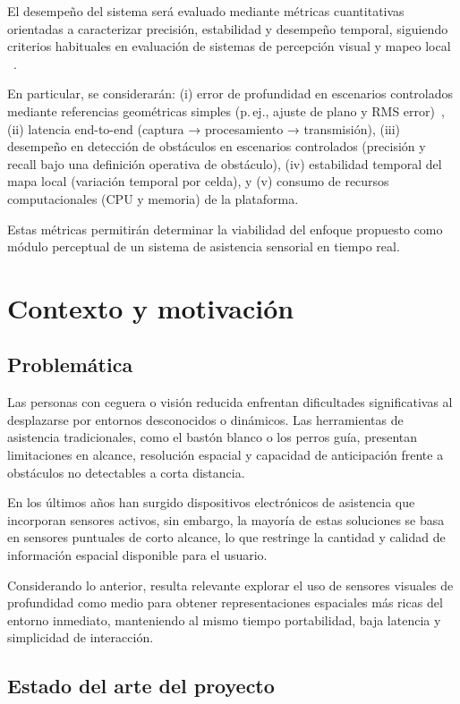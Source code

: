 El desempeño del sistema será evaluado mediante métricas cuantitativas orientadas a caracterizar precisión, estabilidad
y desempeño temporal, siguiendo criterios habituales en evaluación de sistemas de percepción visual y mapeo local
~\cite{sturm12iros}.

En particular, se considerarán:
(i) error de profundidad en escenarios controlados mediante referencias geométricas simples
(p.\,ej., ajuste de plano y RMS error)~\cite{IntelRealSenseDepthTuning},
(ii) latencia end-to-end (captura → procesamiento → transmisión),
(iii) desempeño en detección de obstáculos en escenarios controlados (precisión y recall bajo una definición operativa de obstáculo),
(iv) estabilidad temporal del mapa local (variación temporal por celda), y
(v) consumo de recursos computacionales (CPU y memoria) de la plataforma.

Estas métricas permitirán determinar la viabilidad del enfoque propuesto como módulo perceptual de un sistema de asistencia sensorial en tiempo real.

\section{Contexto y motivación}

\subsection{Problemática}

Las personas con ceguera o visión reducida enfrentan dificultades significativas al desplazarse por entornos desconocidos o dinámicos.
Las herramientas de asistencia tradicionales, como el bastón blanco o los perros guía, presentan limitaciones en alcance, resolución espacial
y capacidad de anticipación frente a obstáculos no detectables a corta distancia.

En los últimos años han surgido dispositivos electrónicos de asistencia que incorporan sensores activos, sin embargo, la mayoría de estas
soluciones se basa en sensores puntuales de corto alcance, lo que restringe la cantidad y calidad de información espacial disponible para el usuario.

Considerando lo anterior, resulta relevante explorar el uso de sensores visuales de profundidad como medio para obtener representaciones espaciales
más ricas del entorno inmediato, manteniendo al mismo tiempo portabilidad, baja latencia y simplicidad de interacción.

\subsection{Estado del arte del proyecto}


